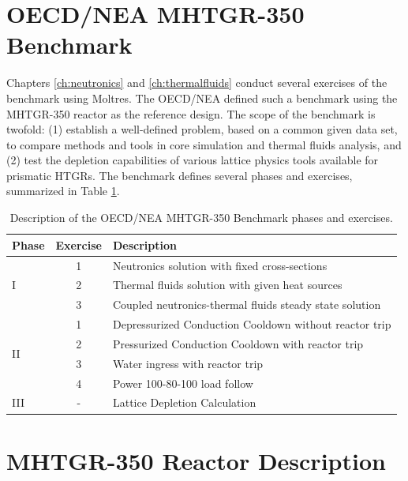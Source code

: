 \section{OECD/NEA MHTGR-350 Benchmark}
\label{sec:ch3-bench}

Chapters \ref{ch:neutronics} and \ref{ch:thermalfluids} conduct several exercises of the benchmark \cite{oecd_nea_benchmark_2017} using Moltres.
The \gls{OECD}/\gls{NEA} defined such a benchmark using the \gls{MHTGR}-350 reactor \cite{silady_licensing_1988} as the reference design.
The scope of the benchmark is twofold: (1) establish a well-defined problem, based on a common given data set, to compare methods and tools in core simulation and thermal fluids analysis, and (2) test the depletion capabilities of various lattice physics tools available for prismatic HTGRs.
The benchmark defines several phases and exercises, summarized in Table \ref{tab:benchmark}.

\begin{table}[htbp!]
  \centering
  \caption{Description of the OECD/NEA MHTGR-350 Benchmark phases and exercises.}
  \begin{tabular}{lcl}
\toprule
Phase               & Exercise & Description                                             \\
\midrule
\multirow{3}{*}{I}  & 1        & Neutronics solution with fixed cross-sections           \\
                    & 2        & Thermal fluids solution with given heat sources         \\
                    & 3        & Coupled neutronics-thermal fluids steady state solution \\
\midrule
\multirow{4}{*}{II} & 1        & Depressurized Conduction Cooldown without reactor trip  \\
                    & 2        & Pressurized Conduction Cooldown with reactor trip       \\
                    & 3        & Water ingress with reactor trip                         \\
                    & 4        & Power 100-80-100 load follow                            \\
\midrule
III                 & -        & Lattice Depletion Calculation                           \\
\bottomrule
  \end{tabular}
  \label{tab:benchmark}
\end{table}

\section{MHTGR-350 Reactor Description}
\label{sec:ch3-mhtgr}

